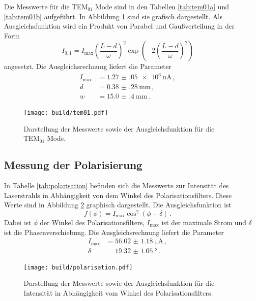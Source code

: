 Die Messwerte für die TEM$_{\mathrm{01}}$ Mode sind in den Tabellen \ref{tab:tem01a} und \ref{tab:tem01b} aufgeführt. In Abbildung \ref{fig:tem01} sind sie grafisch dargestellt. Als Ausgleichsfunktion wird ein Produkt von Parabel und Gaußverteilung in der Form
\begin{equation*}
  I_{0,1}=I_{\text{max}}\left(\frac{L-d}{\omega}\right)^2 \exp\left(-2\left(\frac{L-d}{\omega}\right)^2\right)
\end{equation*}
angesetzt.
Die Ausgleichsrechnung liefert die Parameter
\begin{align*}
  I_{\text{max}}&=\SI{1.27(05)e3}{\nano\ampere} \,,\\
  d&=\SI{0.38(28)}{\milli\metre} \,,\\
  w&=\SI{15.0(4)}{\milli\metre} \,.
\end{align*}

\begin{figure}
  \centering
  \texttt{[image: build/tem01.pdf]}
  \caption{Darstellung der Messwerte sowie der Ausgleichsfunktion für die TEM$_{\mathrm{01}}$ Mode.}
  \label{fig:tem01}
\end{figure}

\subsection{Messung der Polarisierung}
\label{subsec:polarisierung}

In Tabelle \ref{tab:polarisation} befinden sich die Messwerte zur Intensität des
Laserstrahls in Abhängigkeit von dem Winkel des Polarisationsfilters. Diese Werte
sind in Abbildung \ref{fig:polarisation} graphisch dargestellt. Die Ausgleichsfunktion ist
\begin{equation*}
  f(\phi)=I_{\text{max}} \cos^2(\phi+\delta)\,.
\end{equation*}
Dabei ist $\phi$ der Winkel des Polarisationsfilters, $I_{\text{max}}$ ist der
maximale Strom und $\delta$ ist die Phasenverschiebung.
Die Ausgleichsrechnung liefert die Parameter
\begin{align*}
  I_{\text{max}}&=\SI{56.02(118)}{\micro\ampere} \,, \\
  \delta&=\SI{19.32(105)}{\degree} \,.
\end{align*}

\begin{figure}
  \centering
  \texttt{[image: build/polarisation.pdf]}
  \caption{Darstellung der Messwerte sowie der Ausgleichsfunktion für die Intensität in
  Abhängigkeit vom Winkel des Polarisationsfilters.}
  \label{fig:polarisation}
\end{figure}

